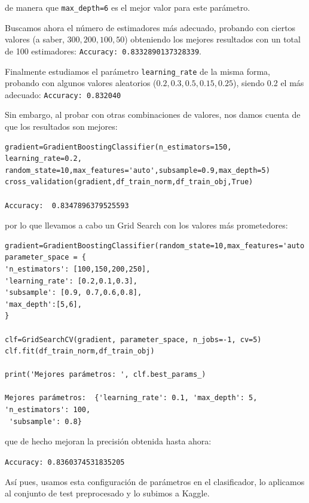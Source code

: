 \documentclass[a4paper,11pt]{article}
\begin{document}
 de manera que \texttt{max_depth=6} es el mejor valor para este parámetro. 
 
 Buscamos ahora el número de estimadores más adecuado, probando con ciertos valores (a saber, $300,200,100,50$) obteniendo los mejores resultados con un total de 100 estimadores: \texttt{Accuracy:  0.8332890137328339}.
 
 Finalmente estudiamos el parámetro \texttt{learning_rate} de la misma forma, probando con algunos valores aleatorios ($0.2,0.3,0.5,0.15,0.25$), siendo 0.2 el más adecuado: \texttt{Accuracy: 0.832040}
 
 Sin embargo, al probar con otras combinaciones de valores, nos damos cuenta de que los resultados son mejores: 
 \begin{verbatim}
gradient=GradientBoostingClassifier(n_estimators=150, learning_rate=0.2, 
random_state=10,max_features='auto',subsample=0.9,max_depth=5)
cross_validation(gradient,df_train_norm,df_train_obj,True)

Accuracy:  0.8347896379525593
 \end{verbatim}

por lo que llevamos a cabo un Grid Search con los valores más prometedores:
\begin{verbatim}
gradient=GradientBoostingClassifier(random_state=10,max_features='auto')
parameter_space = {
'n_estimators': [100,150,200,250],
'learning_rate': [0.2,0.1,0.3],
'subsample': [0.9, 0.7,0.6,0.8],
'max_depth':[5,6],
}

clf=GridSearchCV(gradient, parameter_space, n_jobs=-1, cv=5)
clf.fit(df_train_norm,df_train_obj)

print('Mejores parámetros: ', clf.best_params_)

Mejores parámetros:  {'learning_rate': 0.1, 'max_depth': 5, 'n_estimators': 100,
 'subsample': 0.8}
\end{verbatim} 
 
 que de hecho mejoran la precisión obtenida hasta ahora:
 
\texttt{Accuracy:  0.8360374531835205}
 
 Así pues, usamos esta configuración de parámetros en el clasificador, lo aplicamos al conjunto de test preprocesado y lo subimos a Kaggle.
 
\end{document}
